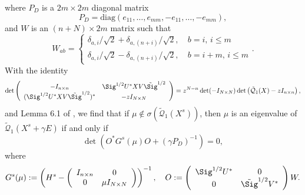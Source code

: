 where $P_D$ is a $2m \times 2m$ diagonal matrix
$$P_D= \text{diag}\left(e_{11}, \ldots, e_{mm}, -e_{11},\ldots, -e_{mm}\right),$$
and $W$ is an $(n+N)\times 2m$ matrix such that
$$W_{ab}= \begin{cases}
\delta_{a,i}/\sqrt{2} + \delta_{a,(n+i)}/\sqrt{2}, \ &b = i , \, i\le m\\
\delta_{a,i}/\sqrt{2} - \delta_{a,(n+i)}/\sqrt{2}, \ &b = i+m , \, i\le m
\end{cases}.$$
With the identity
$$\det\left( {\begin{array}{*{20}c}
   { - I_{n\times n}} & \Sig^{1/2} U^{*}X V\tilde \Sig^{1/2}  \\
   {(\Sig^{1/2} U^{*}X V\tilde \Sig^{1/2})^*} & { - zI_{N\times N}}  \\
\end{array}} \right) =z^{N-n}\det(- I_{N\times N})\det\left(\tilde{\mathcal Q}_1(X) - zI_{n\times n}\right), $$
and Lemma 6.1 of \cite{KY}, we find that if $\mu\notin \sigma(\tilde{\mathcal Q}_1(X^s))$, then $\mu$ is an eigenvalue of $\tilde {\mathcal Q}_1( X^s + \gamma E)$ if and only if
\begin{equation}
\det\left(O^* G^s (\mu)O + (\gamma P_D)^{-1}\right)=0,
\end{equation}
where
$$G^s(\mu):=\left(H^s-\left( {\begin{array}{*{20}c}
   {  I_{n\times n}} & 0  \\
   {0} & { \mu I_{N\times N}}  \\
\end{array}} \right)\right)^{-1}, \quad O:=\left( {\begin{array}{*{20}c}
   {\Sig^{1/2} U^{*}} & 0  \\
   { 0} & {\tilde \Sig^{1/2}V^*}  \\
   \end{array}} \right)W.$$ 
